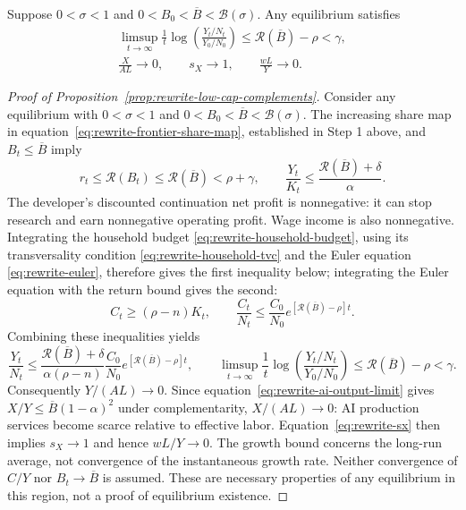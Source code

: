 \begin{proposition}
\label{prop:rewrite-low-cap-complements}
Suppose $0<\sigma<1$ and $0<B_0<\overline B<\mathcal B(\sigma)$.
Any equilibrium satisfies
\begin{gather*}
 \limsup_{t\to\infty}\frac1t
 \log\left(\frac{Y_t/N_t}{Y_0/N_0}\right)
 \leq\mathcal R(\overline B)-\rho<\gamma,\\
 \frac{X}{AL}\to0,\qquad s_X\to1,\qquad \frac{wL}{Y}\to0.
\end{gather*}
\end{proposition}

\begin{proof}[Proof of Proposition~\ref{prop:rewrite-low-cap-complements}]
\label{proof:rewrite-low-cap-complements}
Consider any equilibrium with $0<\sigma<1$ and
$0<B_0<\overline B<\mathcal B(\sigma)$. The increasing share map in
equation~\eqref{eq:rewrite-frontier-share-map}, established in Step 1 above,
and $B_t\leq\overline B$ imply
\begin{equation}
 r_t\leq\mathcal R(B_t)\leq\mathcal R(\overline B)<\rho+\gamma,
 \qquad
 \frac{Y_t}{K_t}\leq\frac{\mathcal R(\overline B)+\delta}{\alpha}.
 \label{eq:rewrite-low-cap-return-bound}
\end{equation}
The developer's discounted continuation net profit is nonnegative: it can
stop research and earn nonnegative operating profit. Wage income is also
nonnegative. Integrating the household budget
\eqref{eq:rewrite-household-budget}, using its transversality condition
\eqref{eq:rewrite-household-tvc} and the Euler equation
\eqref{eq:rewrite-euler}, therefore gives the first inequality below;
integrating the Euler equation with the return bound gives the second:
\begin{equation}
 C_t\geq(\rho-n)K_t,
 \qquad
 \frac{C_t}{N_t}\leq\frac{C_0}{N_0}
 e^{[\mathcal R(\overline B)-\rho]t}.
 \label{eq:rewrite-low-cap-consumption-bound}
\end{equation}
Combining these inequalities yields
\begin{equation}
 \frac{Y_t}{N_t}\leq
 \frac{\mathcal R(\overline B)+\delta}{\alpha(\rho-n)}
 \frac{C_0}{N_0}e^{[\mathcal R(\overline B)-\rho]t},
 \qquad
 \limsup_{t\to\infty}\frac1t
 \log\left(\frac{Y_t/N_t}{Y_0/N_0}\right)
 \leq\mathcal R(\overline B)-\rho<\gamma.
 \label{eq:rewrite-low-cap-growth-bound}
\end{equation}
Consequently $Y/(AL)\to0$. Since equation~\eqref{eq:rewrite-ai-output-limit}
gives $X/Y\leq\overline B(1-\alpha)^2$ under complementarity,
$X/(AL)\to0$: AI production services become scarce relative to effective
labor. Equation~\eqref{eq:rewrite-sx} then implies $s_X\to1$ and hence
$wL/Y\to0$.
The growth bound concerns the long-run average, not convergence of the
instantaneous growth rate. Neither convergence of $C/Y$ nor
$B_t\to\overline B$ is assumed. These are necessary properties of any
equilibrium in this region, not a proof of equilibrium existence.
\end{proof}

